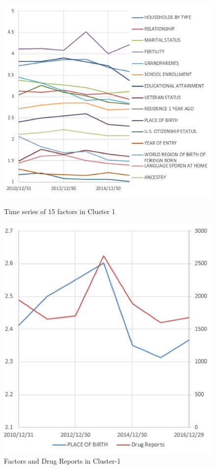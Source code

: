 \documentclass[12pt]{article}
\begin{document}
\begin{figure}[H]
	\centering %
	\begin{minipage}[b]{0.48\textwidth} %
		\centering %
		\includegraphics[scale=0.8]{./figures/9.png} %
		\caption{Time series of 15 factors in Cluster 1}
		\label{Fig9}
	\end{minipage}
	\begin{minipage}[b]{0.48\textwidth} %
		\centering %
		\includegraphics[scale=0.8]{./figures/10.png}%
		\caption{Factors and Drug Reports in Cluster-1}
		\label{Fig10}
	\end{minipage}
\end{figure}
\end{document}

